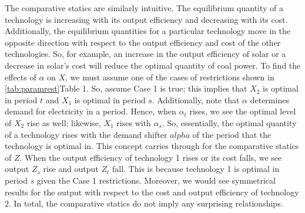 \documentclass[12pt,a4paper]{extarticle}
\begin{document}
The comparative statics are similarly intuitive. The equilibrium quantity of a technology is increasing with its output efficiency and decreasing with its cost. Additionally, the equilibrium quantities for a particular technology move in the opposite direction with respect to the output efficiency and cost of the other technologies. So, for example, an increase in the output efficiency of solar or a decrease in solar's cost will reduce the optimal quantity of coal power. To find the effects of $\alpha$ on $X$, we must assume one of the cases of restrictions shown in \ref{tab:paramrest}{Table 1}. So, assume Case 1 is true; this implies that $X_2$ is optimal in period $t$ and $X_1$ is optimal in period $s$. Additionally, note that $\alpha$ determines demand for electricity in a period. Hence, when $\alpha_t$ rises, we see the optimal level of $X_2$ rise as well; likewise, $X_1$ rises with $\alpha_s$. So, essentially, the optimal quantity of a technology rises with the demand shifter $alpha$ of the period that the technology is optimal in. This concept carries through for the comparative statics of $Z$. When the output efficiency of technology 1 rises or its cost falls, we see output $Z_s$ rise and output $Z_t$ fall. This is because technology 1 is optimal in period $s$ given the Case 1 restrictions. Moreover, we would see symmetrical results for the output with respect to the cost and output efficiency of technology 2. In total, the comparative statics do not imply any surprising relationships. 
\end{document}
